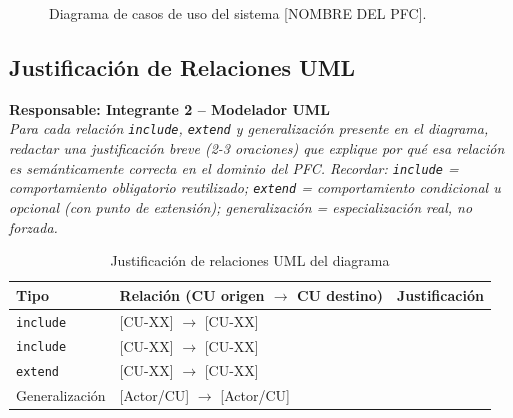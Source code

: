 \documentclass[journal,onecolumn]{IEEEtran}
\newcommand{\guia}[2]{%
  \begin{mdframed}[style=guia]
    \noindent\textbf{Responsable: #1}\\[2pt]
    \textit{#2}
  \end{mdframed}
}
\begin{document}
\begin{figure}[H]
  \centering
  \caption{Diagrama de casos de uso del sistema [NOMBRE DEL PFC].}
  \label{fig:diagrama_cu}
\end{figure}

\subsection{Justificación de Relaciones UML}

\guia{Integrante 2 -- Modelador UML}{%
Para cada relación \texttt{include}, \texttt{extend} y generalización
presente en el diagrama, redactar una justificación breve (2-3 oraciones)
que explique por qué esa relación es semánticamente correcta en el dominio
del PFC. Recordar: \texttt{include} = comportamiento obligatorio reutilizado;
\texttt{extend} = comportamiento condicional u opcional (con punto de extensión);
generalización = especialización real, no forzada.}

\begin{table}[H]
\caption{Justificación de relaciones UML del diagrama}
\label{tab:relaciones}
\begin{tabularx}{\textwidth}{|l|l|X|}
\hline
\textbf{Tipo} & \textbf{Relación (CU origen $\rightarrow$ CU destino)} & \textbf{Justificación} \\
\hline
\texttt{include}  & [CU-XX] $\rightarrow$ [CU-XX] & \\
\hline
\texttt{include}  & [CU-XX] $\rightarrow$ [CU-XX] & \\
\hline
\texttt{extend}   & [CU-XX] $\rightarrow$ [CU-XX] & \\
\hline
Generalización    & [Actor/CU] $\rightarrow$ [Actor/CU] & \\
\hline
\end{tabularx}
\end{table}

\newpage

\end{document}
